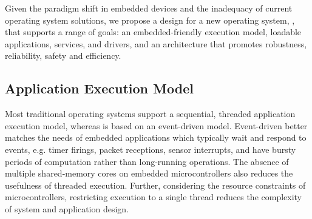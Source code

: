 

Given the paradigm shift in embedded devices and the inadequacy of current
operating system solutions, we propose a design for a new operating system,
\name, that supports a range of goals: an embedded-friendly execution model,
loadable applications, services, and drivers, and an architecture that
promotes robustness, reliability, safety and efficiency.




\subsection{Application Execution Model}
\label{sec:os:execution}

Most traditional operating systems support a sequential, threaded application
execution model, whereas \name is based on an event-driven model. Event-driven
better matches the needs of embedded applications which typically wait and
respond to events, e.g. timer firings, packet receptions, sensor interrupts,
and have bursty periods of computation rather than long-running operations.
The absence of multiple shared-memory cores on embedded microcontrollers also
reduces the usefulness of threaded execution. Further, considering the
resource constraints of microcontrollers, restricting execution to a single
thread reduces the complexity of system and application design.


